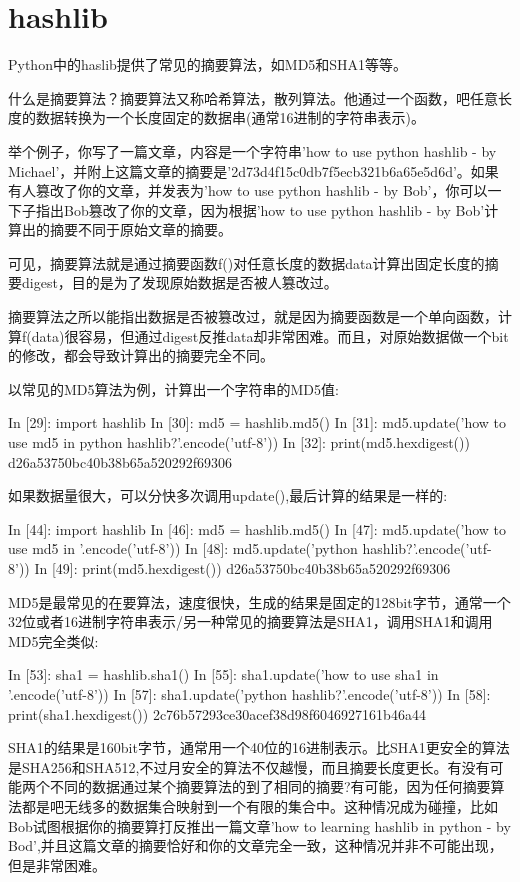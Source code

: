 \section{hashlib}
Python中的haslib提供了常见的摘要算法，如MD5和SHA1等等。

什么是摘要算法？摘要算法又称哈希算法，散列算法。他通过一个函数，吧任意长度的数据转换为一个长度固定的数据串(通常16进制的字符串表示)。

举个例子，你写了一篇文章，内容是一个字符串'how to use python hashlib - by Michael'，并附上这篇文章的摘要是'2d73d4f15c0db7f5ecb321b6a65e5d6d'。如果有人篡改了你的文章，并发表为'how to use python hashlib - by Bob'，你可以一下子指出Bob篡改了你的文章，因为根据'how to use python hashlib - by Bob'计算出的摘要不同于原始文章的摘要。

可见，摘要算法就是通过摘要函数f()对任意长度的数据data计算出固定长度的摘要digest，目的是为了发现原始数据是否被人篡改过。

摘要算法之所以能指出数据是否被篡改过，就是因为摘要函数是一个单向函数，计算f(data)很容易，但通过digest反推data却非常困难。而且，对原始数据做一个bit的修改，都会导致计算出的摘要完全不同。

以常见的MD5算法为例，计算出一个字符串的MD5值:
\begin{python}
In [29]: import hashlib
In [30]: md5 = hashlib.md5()
In [31]: md5.update('how to use md5 in python hashlib?'.encode('utf-8'))
In [32]: print(md5.hexdigest())
	d26a53750bc40b38b65a520292f69306
\end{python}
如果数据量很大，可以分快多次调用update(),最后计算的结果是一样的:
\begin{python}
In [44]: import hashlib
In [46]: md5 = hashlib.md5()
In [47]: md5.update('how to use md5 in '.encode('utf-8'))
In [48]: md5.update('python hashlib?'.encode('utf-8'))
In [49]: print(md5.hexdigest())
d26a53750bc40b38b65a520292f69306

\end{python}
MD5是最常见的在要算法，速度很快，生成的结果是固定的128bit字节，通常一个32位或者16进制字符串表示/另一种常见的摘要算法是SHA1，调用SHA1和调用MD5完全类似:
\begin{python}
In [53]: sha1 = hashlib.sha1()
In [55]: sha1.update('how to use sha1 in '.encode('utf-8'))
In [57]: sha1.update('python hashlib?'.encode('utf-8'))
In [58]: print(sha1.hexdigest())
2c76b57293ce30acef38d98f6046927161b46a44
\end{python}
SHA1的结果是160bit字节，通常用一个40位的16进制表示。比SHA1更安全的算法是SHA256和SHA512,不过月安全的算法不仅越慢，而且摘要长度更长。有没有可能两个不同的数据通过某个摘要算法的到了相同的摘要?有可能，因为任何摘要算法都是吧无线多的数据集合映射到一个有限的集合中。这种情况成为碰撞，比如Bob试图根据你的摘要算打反推出一篇文章'how to learning hashlib in python - by Bod',并且这篇文章的摘要恰好和你的文章完全一致，这种情况并非不可能出现，但是非常困难。

